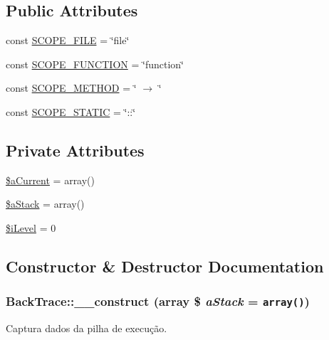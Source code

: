 \subsection*{Public Attributes}
\begin{CompactItemize}
\item 
const \hyperlink{class_back_trace_9efefb3ed5ea7ee8e131f2d8a769fea5}{SCOPE\_\-FILE} = \char`\"{}file\char`\"{}
\item 
const \hyperlink{class_back_trace_ae456bc0b86081f2f7910c0772803224}{SCOPE\_\-FUNCTION} = \char`\"{}function\char`\"{}
\item 
const \hyperlink{class_back_trace_20828cf0730b25b234bd8b63614988f5}{SCOPE\_\-METHOD} = \char`\"{} $\rightarrow$ \char`\"{}
\item 
const \hyperlink{class_back_trace_39bb2bf7f6eedb012f02ca7a78218f4d}{SCOPE\_\-STATIC} = \char`\"{}::\char`\"{}
\end{CompactItemize}
\subsection*{Private Attributes}
\begin{CompactItemize}
\item 
\hyperlink{class_back_trace_754eafcf5d553799f22808cf6f949bd7}{\$aCurrent} = array()
\item 
\hyperlink{class_back_trace_dd74bae86bc7427700c1c6f76864caf8}{\$aStack} = array()
\item 
\hyperlink{class_back_trace_f53bd861302539bdcd96681d27501962}{\$iLevel} = 0
\end{CompactItemize}


\subsection{Constructor \& Destructor Documentation}
\hypertarget{class_back_trace_96ba27da4289af42f20cd0fa1366a19d}{
\subsubsection[{\_\-\_\-construct}]{\setlength{\rightskip}{0pt plus 5cm}BackTrace::\_\-\_\-construct (array \$ {\em aStack} = {\tt array()})}}
\label{class_back_trace_96ba27da4289af42f20cd0fa1366a19d}


Captura dados da pilha de execução.


